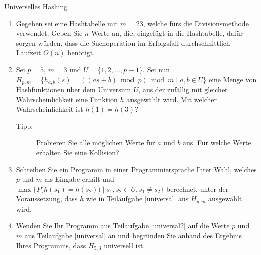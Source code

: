 \documentclass[11pt,a4paper]{article}
\begin{document}
\begin{aufgabe}{5}{Universelles Hashing}
    \begin{enumerate}[label=\alph*)]
        \item Gegeben sei eine Hashtabelle mit $m = 23$, welche fürs die Divisionsmethode verwendet.
        Geben Sie $n$ Werte an, die, eingefügt in die Hashtabelle, dafür sorgen würden, dass die Suchoperation im Erfolgsfall durchschnittlich Laufzeit $O(n)$ benötigt.
        \item \label{universal}
        Sei $p = 5$, $m = 3$ und $U = \{  1, 2, \ldots, p - 1\}$.
        Sei nun $H_{p,m} = \{h_{a,b}(s) = ((as + b) \bmod{p}) \bmod{m} \mid a, b \in U\}$ eine Menge von Hashfunktionen über dem Universum $U$, aus der zufällig mit gleicher Wahrscheinlichkeit eine Funktion $h$ ausgewählt wird.
        Mit welcher Wahrscheinlichkeit ist $h(1) = h(3)$?
        \begin{description}
            \item[Tipp:] Probieren Sie alle möglichen Werte für $a$ und $b$ aus. Für welche Werte erhalten Sie eine Kollision?
        \end{description}
        \item \label{universal2}
        Schreiben Sie ein Programm in einer Programmiersprache Ihrer Wahl, welches $p$ und $m$ als Eingabe erhält und $\max\{P\big(h(s_1) = h(s_2)\big) \mid s_1, s_2 \in U, s_1 \neq s_2\}$ berechnet, unter der Voraussetzung, dass $h$ wie in Teilaufgabe \ref*{universal} aus $H_{p,m}$ ausgewählt wird.
        \item 
        Wenden Sie Ihr Programm aus Teilaufgabe \ref*{universal2} auf die Werte $p$ und $m$ aus Teilaufgabe \ref*{universal} an und begründen Sie anhand des Ergebnis Ihres Programms, dass $H_{5, 3}$ universell ist.  
    \end{enumerate}
\end{aufgabe}
\end{document}
